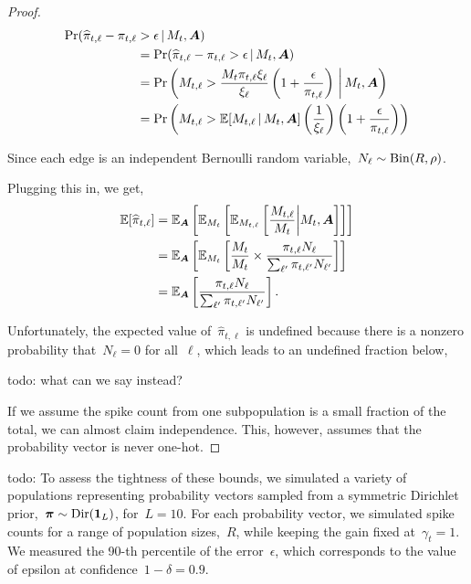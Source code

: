 \begin{proof}
  \begin{align}
    \Pr(\widehat{\pi}_{t, \ell} - \pi_{t,\ell}   &> \epsilon \,|\, M_t, \boldsymbol{A}) \\
    &= \Pr(\widehat{\pi}_{t,\ell} - \pi_{t,\ell}  > \epsilon \,|\, M_t, \boldsymbol{A}) \\
    &= \Pr \left(M_{t,\ell} > \frac{M_t \pi_{t, \ell} \xi_\ell}{\xi_\ell} \left(1+\frac{\epsilon}{\pi_{t, \ell}} \right) \, \bigg| \, M_t, \boldsymbol{A} \right)  \\
    &= \Pr \left(M_{t, \ell} > \mathbb{E}[M_{t,\ell} \,|\, M_t, \boldsymbol{A}] \left(
    \frac{1}{\xi_\ell} \right) \left(1+\frac{\epsilon}{\pi_{t, \ell}}
    \right) \right)
  \end{align}

Since each edge is an independent Bernoulli
  random variable,~$N_\ell \sim \mathrm{Bin}(R, \rho)$. 
  
  Plugging this in, we get,
  \begin{align}
    \mathbb{E}[\widehat{\pi}_{t, \ell}] &= \mathbb{E}_{\boldsymbol{A}}\left[ \mathbb{E}_{M_t} \left[ \mathbb{E}_{M_{t, \ell}} \left[\frac{M_{t, \ell}}{M_t} \bigg| M_t, \boldsymbol{A} \right] \right] \right] \\
    &= \mathbb{E}_{\boldsymbol{A}}\left[ \mathbb{E}_{M_t} \left[ \frac{ M_t}{M_t} \times 
      \frac{  \pi_{t, \ell} N_{\ell}}
      {\sum_{\ell'} \pi_{t, \ell'} N_{\ell'}} \right] \right] \\
    &= \mathbb{E}_{\boldsymbol{A}}\left[ \frac{ \pi_{t, \ell} N_{\ell}}
      {\sum_{\ell'} \pi_{t, \ell'} N_{\ell'}} \right].
  \end{align}

  Unfortunately, the expected value
  of~$\widehat{\pi}_{t, \ell}$ is undefined because there is a nonzero
  probability that~$N_\ell=0$ for all~$\ell$, which leads to an
  undefined fraction below,
  
  todo: what can we say instead?

  If we assume the spike count from one subpopulation is a small
  fraction of the total, we can almost claim independence. This,
  however, assumes that the probability vector is never one-hot. 

\end{proof}

todo: To assess the tightness of these bounds, we simulated a variety of 
populations representing probability vectors sampled from a symmetric
Dirichlet prior,~$\boldsymbol{\pi} \sim \mathrm{Dir}(\boldsymbol{1}_L)$, for~$L=10$. For each 
probability vector, we simulated spike counts for a range of 
population sizes,~$R$, while keeping the gain fixed at~$\gamma_t=1$.
We measured the 90-th percentile of the error~$\epsilon$, which 
corresponds to the value of epsilon at confidence~$1-\delta=0.9$.



